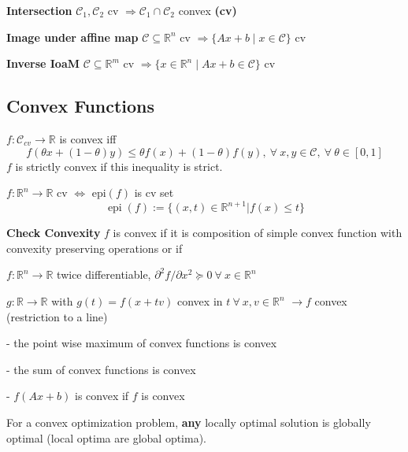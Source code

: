 \textbf{Intersection}
$\mathcal{C}_1, \mathcal{C}_2$ cv
$\Rightarrow \mathcal{C}_1 \cap \mathcal{C}_2$ convex \textbf{(cv)}

\textbf{Image under affine map}
$\mathcal{C} \subseteq  \mathbb{R}^{n}$ cv
$\Rightarrow \{Ax+b \mid x \in \mathcal{C} \}$ cv

\textbf{Inverse IoaM}
$\mathcal{C} \subseteq  \mathbb{R}^{m}$ cv
$\Rightarrow \{x\in\mathbb{R}^{n} \mid  Ax+b\in\mathcal{C}\}$ cv

\subsection{Convex Functions}

\begin{definition}
	$f: \mathcal{C}_{cv} \to\mathbb{R}$ is convex iff
	\[
		f(\theta x + (1-\theta)y)\le \theta f(x)+ (1-\theta)f(y),
		\ \forall\ x,y \in \mathcal{C},
		\ \forall\ \theta \in [0,1]\]
	$f$ is strictly convex if this inequality is strict.
\end{definition}


\begin{definition}[Epigraph]
	$f:\mathbb{R}^n \rightarrow \mathbb{R}$ cv
	$\Leftrightarrow$
	epi$(f)$ is cv set
	$$\operatorname{epi}(f):=\{(x,t)\in \mathbb{R}^{n+1} | f(x)\le t\}$$
\end{definition}

\textbf{Check Convexity} $f$ is convex if it is
composition of simple convex function
with convexity preserving operations
or if


$f: \mathbb{R}^n \rightarrow \mathbb{R}$ twice differentiable,
$\partial^2f/\partial x^2 \succeq 0\ \forall\ x \in \mathbb{R}^{n}$

$g: \mathbb{R} \rightarrow \mathbb{R}$ with $g(t)=f(x+tv)$
convex in $t\ \forall\ x,v \in \mathbb{R}^{n}$
$\rightarrow f$ convex (restriction to a line)



- the point wise maximum of convex functions is convex

- the sum of convex functions is convex

- $f(Ax+b)$ is convex if $f$ is convex




\begin{theorem}
	For a convex optimization problem,
	\textbf{any} locally optimal solution is globally
	optimal (local optima are global optima).
\end{theorem}


